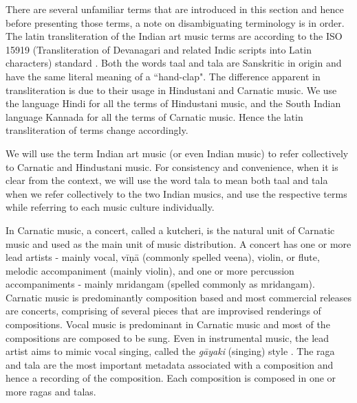 There are several unfamiliar terms that are introduced in this section and hence before presenting those terms, a note on disambiguating terminology is in order. The latin transliteration of the Indian art music terms are according to the ISO 15919 (Transliteration of Devanagari and related Indic scripts into Latin characters) standard \cite{iso:01:15919trans}. Both the words \gls{taal} and \gls{tala} are Sanskritic in origin and have the same literal meaning of a ``hand-clap". The difference apparent in transliteration is due to their usage in Hindustani and Carnatic music. We use the language Hindi for all the terms of Hindustani music, and the South Indian language Kannada for all the terms of Carnatic music. Hence the latin transliteration of terms change accordingly. 

We will use the term Indian art music (or even Indian music) to refer collectively to Carnatic and Hindustani music. For consistency and convenience, when it is clear from the context, we will use the word \gls{tala} to mean both \gls{taal} and \gls{tala} when we refer collectively to the two Indian musics, and use the respective terms while referring to each music culture individually. 

In Carnatic music, a concert, called a \gls{kutcheri}, is the natural unit of Carnatic music and used as the main unit of music distribution. A concert has one or more lead artists - mainly vocal, vīṇā (commonly spelled veena), violin, or flute, melodic accompaniment (mainly violin), and one or more percussion accompaniments - mainly \gls{mridangam} (spelled commonly as mridangam). Carnatic music is predominantly composition based and most commercial releases are concerts, comprising of several pieces that are improvised renderings of compositions. Vocal music is predominant in Carnatic music and most of the compositions are composed to be sung. Even in instrumental music, the lead artist aims to mimic vocal singing, called the \textit{gāyaki} (singing) style \cite{vishwanathan:04:music}. The \gls{raga} and \gls{tala} are the most important metadata associated with a composition and hence a recording of the composition. Each composition is composed in one or more \glspl{raga} and \glspl{tala}. 

